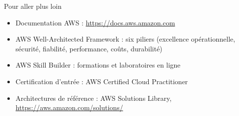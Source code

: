 \begin{frame}{Pour aller plus loin}
  \begin{itemize}
    \setlength{\itemsep}{.5em}
    \item Documentation AWS : \url{https://docs.aws.amazon.com}
    \item AWS Well-Architected Framework : six piliers (excellence opérationnelle, sécurité, fiabilité, performance, coûts, durabilité)
    \item AWS Skill Builder : formations et laboratoires en ligne
    \item Certification d'entrée : AWS Certified Cloud Practitioner
    \item Architectures de référence : AWS Solutions Library, \url{https://aws.amazon.com/solutions/}
  \end{itemize}
\end{frame}
